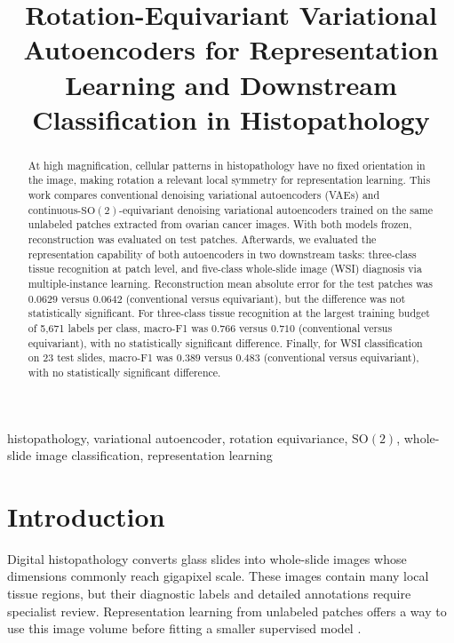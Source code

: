 \documentclass[conference,a4paper]{IEEEtran}
\title{Rotation-Equivariant Variational Autoencoders for Representation
Learning and Downstream Classification in Histopathology}
\author{\IEEEauthorblockN{Anonymous Authors}}
\newcommand{\SOtwo}{\mathrm{SO}(2)}
\begin{document}
\raggedbottom
{}

\maketitle

\begin{abstract}
At high magnification, cellular patterns in histopathology have no fixed
orientation in the image, making rotation a relevant local symmetry for representation
learning. This work compares conventional denoising variational autoencoders (VAEs) and continuous-$\SOtwo$-equivariant
denoising variational autoencoders trained on the same unlabeled
patches extracted from ovarian cancer images. With both models frozen, reconstruction was evaluated on test patches. Afterwards, 
we evaluated the representation capability of both autoencoders in two downstream tasks: three-class tissue recognition at patch
level, and five-class whole-slide image (WSI) diagnosis via multiple-instance
learning. Reconstruction mean absolute error for the test patches was $0.0629$ versus $0.0642$ (conventional versus
equivariant), but the difference was not statistically significant. For three-class tissue recognition at the largest training budget of 5,671 labels per class, macro-F1 was $0.766$ versus $0.710$ (conventional versus equivariant), with no statistically significant difference. Finally, for WSI classification on 23 test slides, macro-F1 was
$0.389$ versus $0.483$ (conventional versus equivariant),
with no statistically significant difference.
\end{abstract}

\begin{IEEEkeywords}
histopathology, variational autoencoder, rotation equivariance, $\SOtwo$,
whole-slide image classification, representation learning
\end{IEEEkeywords}

\section{Introduction}

Digital histopathology converts glass slides into whole-slide images whose
dimensions commonly reach gigapixel scale. These images contain many local
tissue regions, but their diagnostic labels and detailed annotations require
specialist review. Representation learning from unlabeled patches offers a way
to use this image volume before fitting a smaller supervised model
\cite{litjens_survey_2017,song_artificial_2023,tellez_neural_2021}.
\end{document}
